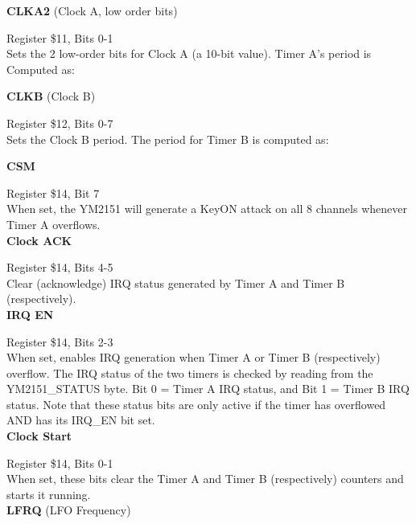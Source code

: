 {\bfseries CLKA2} (Clock A, low order bits)

Register \$11, Bits 0-1\\

Sets the 2 low-order bits for Clock A (a 10-bit value).  Timer A's period is
Computed as:\\


{\bfseries CLKB} (Clock B)

Register \$12, Bits 0-7\\

Sets the Clock B period.  The period for Timer B is computed as:\\


{\bfseries CSM}

Register \$14, Bit 7\\

When set, the YM2151 will generate a KeyON attack on all 8 channels whenever
Timer A overflows.\\

{\bfseries Clock ACK}

Register \$14, Bits 4-5\\

Clear (acknowledge) IRQ status generated by Timer A and Timer B
(respectively).\\

{\bfseries IRQ EN}

Register \$14, Bits 2-3\\

When set, enables IRQ generation when Timer A or Timer B (respectively)
overflow.  The IRQ status of the two timers is checked by reading from the
YM2151\_STATUS byte.  Bit 0 = Timer A IRQ status, and Bit 1 = Timer B IRQ
status. Note that these status bits are only active if the timer has overflowed
AND has its IRQ\_EN bit set.\\

{\bfseries Clock Start}

Register \$14, Bits 0-1\\

When set, these bits clear the Timer A and Timer B (respectively) counters and
starts it running.\\

{\bfseries LFRQ} (LFO Frequency)

